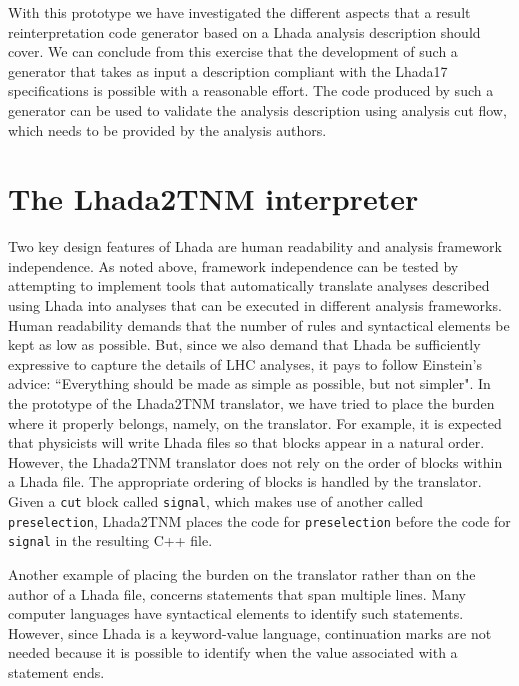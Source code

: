 \documentclass[11pt]{cernrep}
\begin{document}
With this prototype we have investigated the different aspects that a result reinterpretation code generator based on a {\sc Lhada} analysis description should cover. We can conclude from this exercise that the development of such a generator that takes as input a description compliant with the {\sc Lhada17} specifications is possible with a reasonable effort. The code produced by such a generator can be used to validate the analysis description using analysis cut flow, which needs to be provided by the analysis authors.  


\section{The {\sc Lhada2TNM} interpreter}
%

Two key design features of {\sc Lhada} are human readability and analysis framework independence. As noted above, framework independence can be tested by attempting to implement tools that automatically translate analyses described using {\sc Lhada} into analyses that can be executed in different analysis frameworks. Human readability demands that  the number of rules and syntactical elements be kept as low as possible. But, since we also demand that {\sc Lhada} be sufficiently expressive to capture the details of LHC analyses, it pays to follow Einstein's advice: ``Everything should be made as simple as possible, but not simpler".    In the prototype of the  {\sc Lhada2TNM} translator, we have tried to place the burden where it properly belongs, namely, on the translator. For example, it is expected that physicists will write {\sc Lhada} files so that blocks appear in a natural order. However, the {\sc Lhada2TNM} translator does not rely on the order of blocks within a {\sc Lhada} file. The appropriate ordering of blocks is handled by the translator. Given a {\tt cut} block called {\tt signal}, which makes use of another called {\tt preselection}, {\sc Lhada2TNM} places  the code for {\tt preselection} before the code for {\tt signal} in the resulting C++ file.

Another example of placing the burden on the translator rather than on the author of a {\sc Lhada} file, concerns statements that span multiple lines. Many computer languages have syntactical elements to identify such statements. However, since {\sc Lhada} is a keyword-value language, continuation marks are not needed because it is possible to identify when the value associated with a statement ends.
\end{document}
